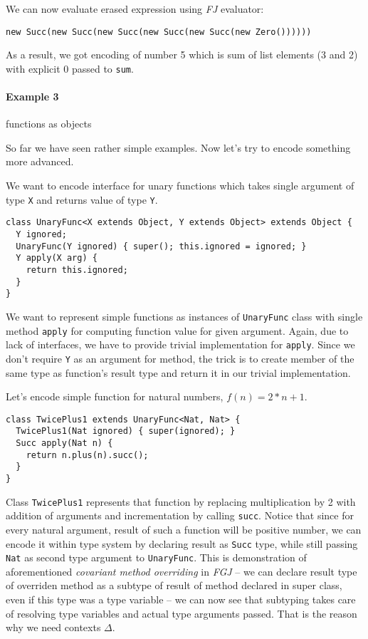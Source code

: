 \documentclass{article}[12pt]
\begin{document}
We can now evaluate erased expression using \emph{FJ} evaluator:

\begin{verbatim}
new Succ(new Succ(new Succ(new Succ(new Succ(new Zero())))))
\end{verbatim}

As a result, we got encoding of number 5 which is sum of list elements (3 and 2) with explicit 0 passed to \texttt{sum}.

\paragraph{Example 3} functions as objects

So far we have seen rather simple examples. Now let's try to encode something more advanced.

We want to encode interface for unary functions which takes single argument of type \texttt{X} and returns value of type \texttt{Y}.

\begin{verbatim}
class UnaryFunc<X extends Object, Y extends Object> extends Object {
  Y ignored;
  UnaryFunc(Y ignored) { super(); this.ignored = ignored; }
  Y apply(X arg) {
    return this.ignored;
  }
}
\end{verbatim}

We want to represent simple functions as instances of \texttt{UnaryFunc} class with single method \texttt{apply} for computing function value for given argument. Again, due to lack of interfaces, we have to provide trivial implementation for \texttt{apply}. Since we don't require \texttt{Y} as an argument for method, the trick is to create member of the same type as function's result type and return it in our trivial implementation.

Let's encode simple function for natural numbers, $f(n) = 2 * n + 1$.

\begin{verbatim}
class TwicePlus1 extends UnaryFunc<Nat, Nat> {
  TwicePlus1(Nat ignored) { super(ignored); }
  Succ apply(Nat n) {
    return n.plus(n).succ();
  }
}
\end{verbatim}

Class \texttt{TwicePlus1} represents that function by replacing multiplication by 2 with addition of arguments and incrementation by calling \texttt{succ}. Notice that since for every natural argument, result of such a function will be positive number, we can encode it within type system by declaring result as \texttt{Succ} type, while still passing \texttt{Nat} as second type argument to \texttt{UnaryFunc}. This is demonstration of aforementioned \emph{covariant method overriding} in \emph{FGJ} -- we can declare result type of overriden method as a subtype of result of method declared in super class, even if this type was a type variable -- we can now see that subtyping takes care of resolving type variables and actual type arguments passed. That is the reason why we need contexts $\Delta$.
\end{document}
